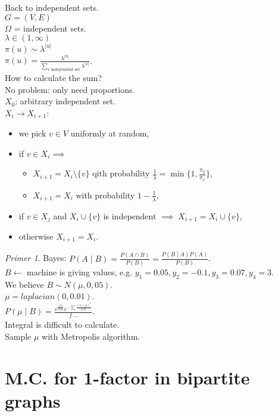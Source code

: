 \documentclass[a4paper, 12pt]{book}
\theoremstyle{definition}
\theoremstyle{remark}
\newtheorem*{ex}{Primer}
\begin{document}

Back to independent sets. \\
$G = (V, E)$ \\
$\Omega$ = independent sets. \\
$\lambda \in (1, \infty)$ \\
$\pi(u) \sim \lambda^{|u|}$ \\
$\pi(u) = \frac{\lambda^{|u|}}{\sum_{v \text{ independent set}} \lambda^{|v|}}$. \\
How to calculate the sum? \\
No problem: only need proportions. \\
$X_0$: arbitrary independent set. \\
$X_i \to X_{i+1}$:
\begin{itemize}
  \item we pick $v \in V$ uniformly at random,
  \item if $v \in X_i \implies$
    \begin{itemize}
      \item $X_{i+1} = X_i \setminus \{v\}$ qith probability $\frac{1}{\lambda} = \min \{1, \frac{\pi_y}{\pi_x}\}$,
      \item $X_{i+1} = X_i$ with probability $1 - \frac{1}{\lambda}$,
    \end{itemize}
  \item if $v \in X_j$ and $X_i \cup \{v\}$ is independent $\implies \; X_{i+1} = X_i \cup \{v\}$,
  \item otherwise $X_{i+1} = X_i$.
\end{itemize}
\begin{ex} \text{}
  Bayes: $P(A \mid B) = \frac{P(A \cap B)}{P(B)} = \frac{P(B \mid A) P(A)}{P(B)}$. \\
  $B \leftarrow$ machine is giving values, e.g. $y_1 = 0.05, y_2 = -0.1, y_3 = 0.07, y_4 = 3$. \\
  We believe $B \sim N(\mu, 0,05)$. \\
  $\mu = laplacian(0, 0.01)$. \\
  $P(\mu \mid B) = \frac{e^{\frac{|\mu|}{0.01}} e^{-\sum \frac{(x_i-\mu)^2}{0.05}}}{\int \dots}$. \\
  Integral is difficult to calculate. \\
  Sample $\mu$ with Metropolis algorithm.
\end{ex}


\section{M.C. for 1-factor in bipartite graphs}
\end{document}
